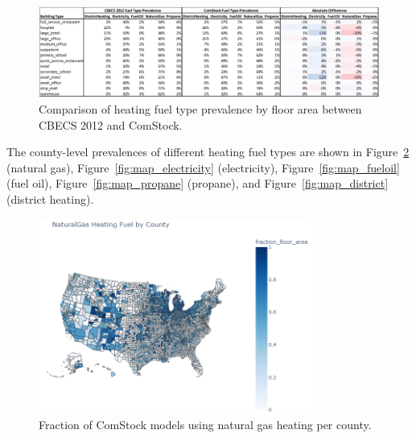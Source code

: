 \begin{figure}
  \centering
  \includegraphics[width=1.10\textwidth]{figures/cbecs_comstock_fuel_type_comparison.png}
  \caption[Comparison of heating fuel type prevalence by floor area between CBECS 2012 and ComStock.]{Comparison of heating fuel type prevalence by floor area between CBECS 2012 and ComStock.}
  \label{fig:fuel_cbecs_v_cstock}
\end{figure}

The county-level prevalences of different heating fuel types are shown in Figure~\ref{fig:map_naturalgas} (natural gas), Figure~\ref{fig:map_electricity} (electricity), Figure~\ref{fig:map_fueloil} (fuel oil), Figure~\ref{fig:map_propane} (propane), and Figure~\ref{fig:map_district} (district heating).

\begin{figure}
  \centering
  \includegraphics[width=0.8\textwidth]{figures/map_naturalgas.png}
  \caption[Fraction of ComStock models using natural gas heating/water heating per county]{Fraction of ComStock models using natural gas heating per county.}
  \label{fig:map_naturalgas}
\end{figure}

